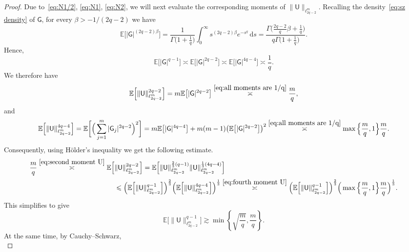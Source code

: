 \documentclass[11pt,reqno]{amsart}
\renewcommand{\le}{\leqslant}
\newcommand{\ud}[0]{\,\mathrm{d}}
\theoremstyle{remark}
\newcommand{\E}{\mathbb{ E}}
\renewcommand{\1}{\mathbf 1}
\newcommand{\sfG}{\mathsf{G}}
\newcommand{\sfU}{\mathsf{U}}
\begin{document}
\begin{proof}
Due to~\eqref{eq:N1/2}, \eqref{eq:N1}, \eqref{eq:N2}, we will next evaluate the corresponding moments of $\|\sfU\|_{\ell_{2q-2}^m}$. Recalling the density~\eqref{eq:sz density} of $\sfG$, for every $\beta>-1/(2q-2)$ we have
$$
\E\big[|\sfG|^{(2q-2)\beta}\big]=\frac{1}{\Gamma\big(1+\frac{1}{q}\big)}\int_0^\infty s^{(2q-2)\beta}e^{-s^q}\ud s=\frac{\Gamma\big(\frac{2q-2}{q}\beta+\frac{1}{q}\big)}{q\Gamma\big(1+\frac{1}{q}\big)}.
$$
Hence,
\begin{equation}\label{eq:all moments are 1/q}
\E\big[|\sfG|^{q-1}\big]\asymp \E\big[|\sfG|^{2q-2}\big]\asymp \E\big[|\sfG|^{4q-4}\big]\asymp \frac{1}{q}.
\end{equation}
We therefore have
\begin{equation}\label{eq:second moment U}
\E \Big[\|\sfU\|_{\ell_{2q-2}^m}^{2q-2}\Big]=m\E\big[|\sfG|^{2q-2}\big]\stackrel{\eqref{eq:all moments are 1/q}}{\asymp} \frac{m}{q},
\end{equation}
and
\begin{equation}\label{eq:fourth moment U}
\E \Big[\|\sfU\|_{\ell_{2q-2}^m}^{4q-4}\Big]=\E \bigg[\Big(\sum_{j=1}^m |\sfG_j|^{2q-2} \Big)^2\bigg]= m\E\big[|\sfG|^{4q-4}\big]+m(m-1) \big(\E\big[|\sfG|^{2q-2}\big]\big)^2\stackrel{\eqref{eq:all moments are 1/q}}{\asymp} \max \Big\{\frac{m}{q},1\Big\}\frac{m}{q}.
\end{equation}
Consequently, using H\"older's inequality we get the following estimate.
\begin{align}\label{eq:use holder 3/2}
\begin{split}
\frac{m}{q}\stackrel{\eqref{eq:second moment U}}{\asymp} \E \Big[&\|\sfU\|_{\ell_{2q-2}^m}^{2q-2}\Big]=\E \Big[\|\sfU\|_{\ell_{2q-2}^m}^{\frac23(q-1)}\|\sfU\|_{\ell_{2q-2}^m}^{\frac13(4q-4)}\Big]\\&\le \Big(\E \Big[\|\sfU\|_{\ell_{2q-2}^m}^{q-1}\Big]\Big)^{\frac23}\Big(\E \Big[\|\sfU\|_{\ell_{2q-2}^m}^{4q-4}\Big]\Big)^{\frac13}\stackrel{\eqref{eq:fourth moment U}}{\asymp} \Big(\E \Big[\|\sfU\|_{\ell_{2q-2}^m}^{q-1}\Big]\Big)^{\frac23}\Big(\max \Big\{\frac{m}{q},1\Big\}\frac{m}{q}\Big)^{\frac13}.
\end{split}
\end{align}
This simplifies to give
\begin{equation}\label{eq:lower 1/2 U}
\E \Big[\|\sfU\|_{\ell_{2q-2}^m}^{q-1}\Big]\gtrsim \min\left\{\sqrt{\frac{m}{q}},\frac{m}{q}\right\}.
\end{equation}
At the same time, by Cauchy--Schwarz,
\begin{equation}\label{eq:CS U}

\end{equation}
\end{proof}
\end{document}
